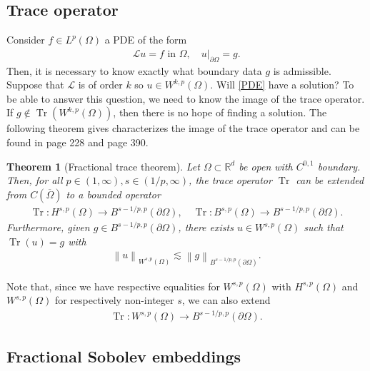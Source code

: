 \documentclass[
    a4paper,
    DIV=14,
    abstract=true,
    numbers=noenddot
]
{scrartcl}
\newtheorem{theorem}{Theorem}[section]
\theoremstyle{definition}
\renewcommand{\norm}[1]{\left\lVert #1 \right\rVert}\renewcommand{\abs}[1]{\left| #1 \right|}
\newcommand\restr[2]{\left.#1\right|_{#2}}
\newcommand{\R}{\mathbb{R}}
\newcommand{\Ll}{\mathcal{L}}
\begin{document}
\subsection{Trace operator}
Consider $f \in L^p(\Omega )$  a PDE of the form
\begin{align}\label{PDE}
  \Ll u =f \text{ in } \Omega , \quad \restr{u}{\partial \Omega }= g.
\end{align}
Then, it is necessary to  know exactly what boundary data $g$ is admissible. Suppose that $\Ll $ is of order $k$ so   $u \in W^{k,p}(\Omega )$. Will \eqref{PDE} have a solution? To be able to answer this question, we need to know the image of the trace operator. If $g \notin \operatorname{Tr}(W^{k,p}(\Omega ))$, then there is no hope of finding a solution. The following theorem gives characterizes the image of the trace operator and can be found in \cite{agranovich2015sobolev} page 228 and \cite{leoni2023first} page 390.
\begin{theorem}[Fractional trace theorem]\label{trace theorem}
  Let $\Omega \subset \R^d$ be open with $C^{0,1}$ boundary. Then, for all  $p\in (1,\infty), s\in (1/p,\infty) $, the trace operator $\operatorname{Tr}$ can be extended from $C(\overline{\Omega } )$  to a bounded operator
  \begin{align*}
    \operatorname{Tr}: H^{s,p}(\Omega ) \to B^{s-1/p,p}(\partial\Omega), \quad \operatorname{Tr}: B^{s,p}(\Omega ) \to B^{s-1/p,p}(\partial\Omega).
  \end{align*}
  Furthermore, given $g \in B^{s-1/p,p}(\partial\Omega)$, there exists $u \in W^{s,p}(\Omega )$ such that $\operatorname{Tr}(u)=g$ with
  \begin{align*}
    \norm{u}_{W^{s,p}(\Omega )}\lesssim \norm{g}_{B^{s-1/p,p}(\partial\Omega)}.
  \end{align*}
\end{theorem}
Note that, since we have respective equalities for $W^{s,p}(\Omega )$ with $H^{s,p}(\Omega )$ and $W^{s,p}(\Omega )$ for respectively non-integer  $s$, we can also extend
\begin{align*}
  \operatorname{Tr}: W^{s,p}(\Omega ) \to B^{s-1/p,p}(\partial\Omega).
\end{align*}
\subsection{Fractional Sobolev embeddings}\label{fractional embeddings}
\end{document}
